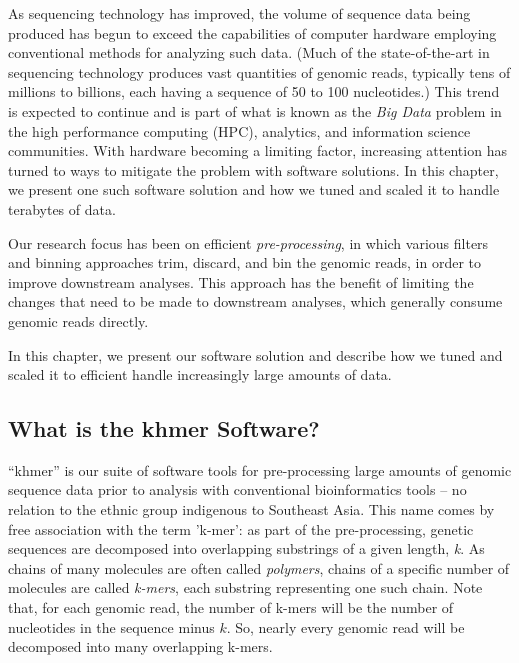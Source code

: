 \documentclass{article}
\begin{document}

As sequencing technology has improved, the volume of sequence data being
produced has begun to exceed the capabilities of computer hardware employing
conventional methods for analyzing such data. (Much of the state-of-the-art in
sequencing technology produces vast quantities of genomic reads, typically tens
of millions to billions, each having a sequence of 50 to 100 nucleotides.) This
trend is expected to continue and is part of what is known as the \textit{Big
Data} \cite{web:bigdata} problem in the high performance computing (HPC),
analytics, and information science communities.  With hardware becoming a
limiting factor, increasing attention has turned to ways to mitigate the
problem with software solutions.  In this chapter, we present one such software
solution and how we tuned and scaled it to handle terabytes of data.

Our research focus has been on efficient {\em pre-processing}, in which
various filters and binning approaches trim, discard, and bin the
genomic reads, in order to improve downstream analyses.  This approach
has the benefit of limiting the changes that need to be made to downstream
analyses, which generally consume genomic reads directly.


In this chapter, we present our software solution and describe how we
tuned and scaled it to efficient handle increasingly large amounts of
data.

\subsection{What is the khmer Software?}

``khmer'' is our suite of software tools for pre-processing large
amounts of genomic sequence data prior to analysis with conventional
bioinformatics tools \cite{web:khmer} -- no relation to the ethnic
group indigenous to Southeast Asia.  This name comes by free
association with the term 'k-mer': as part of the pre-processing,
genetic sequences are decomposed into overlapping substrings of a
given length, \textit{k}. As chains of many molecules are often called
\textit{polymers}, chains of a specific number of molecules are called
\textit{k-mers}, each substring representing one such chain.  Note
that, for each genomic read, the number of k-mers will be the number
of nucleotides in the sequence minus $k$. So, nearly
every genomic read will be decomposed into many overlapping k-mers.
\end{document}
